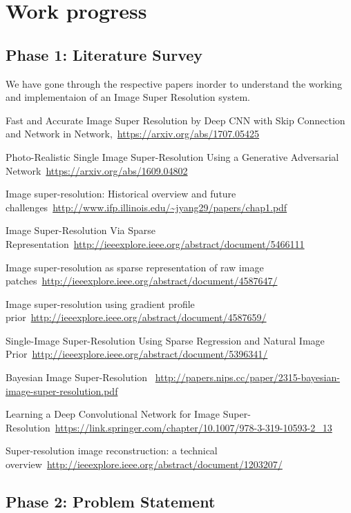 \chapter{Work progress}

\section{Phase 1: Literature Survey}

We have gone through the respective papers inorder to understand the working and implementaion of an Image Super Resolution system.

\bibitem{}Fast and Accurate Image Super Resolution by Deep CNN with Skip Connection and Network in Network,\ \url{https://arxiv.org/abs/1707.05425}

\bibitem{} Photo-Realistic Single Image Super-Resolution Using a Generative Adversarial Network\ \url{https://arxiv.org/abs/1609.04802}

\bibitem{}Image super-resolution: Historical overview
and future challenges\ \url{http://www.ifp.illinois.edu/~jyang29/papers/chap1.pdf}


\bibitem{}Image Super-Resolution Via Sparse Representation\ \url{http://ieeexplore.ieee.org/abstract/document/5466111}

\bibitem{}Image super-resolution as sparse representation of raw image patches\ \url{http://ieeexplore.ieee.org/abstract/document/4587647/}

\bibitem{}Image super-resolution using gradient profile prior\ \url{http://ieeexplore.ieee.org/abstract/document/4587659/}

\bibitem{}Single-Image Super-Resolution Using Sparse Regression and Natural Image Prior\ \url{http://ieeexplore.ieee.org/abstract/document/5396341/}

\bibitem{}Bayesian Image Super-Resolution \ \url{http://papers.nips.cc/paper/2315-bayesian-image-super-resolution.pdf}

\bibitem{}Learning a Deep Convolutional Network for Image Super-Resolution\ \url{https://link.springer.com/chapter/10.1007/978-3-319-10593-2_13}

\bibitem{}Super-resolution image reconstruction: a technical overview\ \url{http://ieeexplore.ieee.org/abstract/document/1203207/}

\section{Phase 2: Problem Statement}

